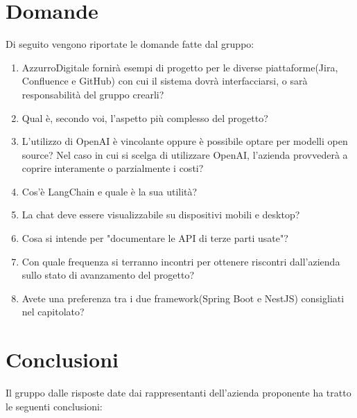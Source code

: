 \documentclass[a4paper, 12pt]{article}
\begin{document}
\section{Domande}
Di seguito vengono riportate le domande fatte dal gruppo:
\begin{enumerate}
    \item  AzzurroDigitale fornirà esempi di progetto per le diverse piattaforme(Jira, Confluence e GitHub) con cui il sistema dovrà interfacciarsi, o sarà responsabilità del gruppo crearli?
    \item Qual è, secondo voi, l’aspetto più complesso del progetto?
    \item L’utilizzo di OpenAI è vincolante oppure è possibile optare per modelli open source? Nel caso in cui si scelga di utilizzare OpenAI, l’azienda provvederà a coprire interamente o parzialmente i costi?
    \item Cos'è LangChain e quale è la sua utilità?
    \item La chat deve essere visualizzabile su dispositivi mobili e desktop?
    \item  Cosa si intende per "documentare le API di terze parti usate"?
    \item  Con quale frequenza si terranno incontri per ottenere riscontri dall'azienda sullo stato di avanzamento del progetto?
    \item  Avete una preferenza tra i due framework(Spring Boot e NestJS) consigliati nel capitolato?
\end{enumerate}

\section{Conclusioni}
Il gruppo dalle risposte date dai rappresentanti dell'azienda proponente ha tratto le seguenti conclusioni:
\end{document}

